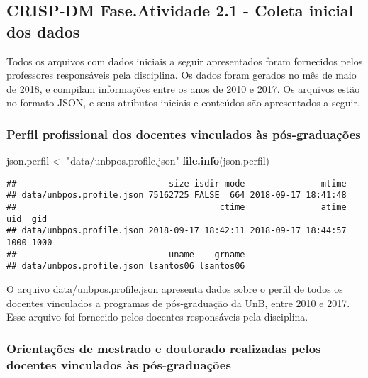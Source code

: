 \documentclass[]{article}
\newenvironment{Shaded}{\begin{snugshade}}{\end{snugshade}}
\newcommand{\KeywordTok}[1]{\textcolor[rgb]{0.13,0.29,0.53}{\textbf{#1}}}
\newcommand{\StringTok}[1]{\textcolor[rgb]{0.31,0.60,0.02}{#1}}
\newcommand{\NormalTok}[1]{#1}
\begin{document}
\subsection{CRISP-DM Fase.Atividade 2.1 - Coleta inicial dos
dados}\label{crisp-dm-fase.atividade-2.1---coleta-inicial-dos-dados}

Todos os arquivos com dados iniciais a seguir apresentados foram
fornecidos pelos professores responsáveis pela disciplina. Os dados
foram gerados no mês de maio de 2018, e compilam informações entre os
anos de 2010 e 2017. Os arquivos estão no formato JSON, e seus atributos
iniciais e conteúdos são apresentados a seguir.

\subsubsection{Perfil profissional dos docentes vinculados às
pós-graduações}\label{perfil-profissional-dos-docentes-vinculados-as-pos-graduacoes}

\begin{Shaded}
\begin{Highlighting}[]
\NormalTok{json.perfil <-}\StringTok{ "data/unbpos.profile.json"}
\KeywordTok{file.info}\NormalTok{(json.perfil)}
\end{Highlighting}
\end{Shaded}

\begin{verbatim}
##                              size isdir mode               mtime
## data/unbpos.profile.json 75162725 FALSE  664 2018-09-17 18:41:48
##                                        ctime               atime  uid  gid
## data/unbpos.profile.json 2018-09-17 18:42:11 2018-09-17 18:44:57 1000 1000
##                              uname    grname
## data/unbpos.profile.json lsantos06 lsantos06
\end{verbatim}

O arquivo data/unbpos.profile.json apresenta dados sobre o perfil de
todos os docentes vinculados a programas de pós-graduação da UnB, entre
2010 e 2017. Esse arquivo foi fornecido pelos docentes responsáveis pela
disciplina.

\subsubsection{Orientações de mestrado e doutorado realizadas pelos
docentes vinculados às
pós-graduações}\label{orientacoes-de-mestrado-e-doutorado-realizadas-pelos-docentes-vinculados-as-pos-graduacoes}
\end{document}
